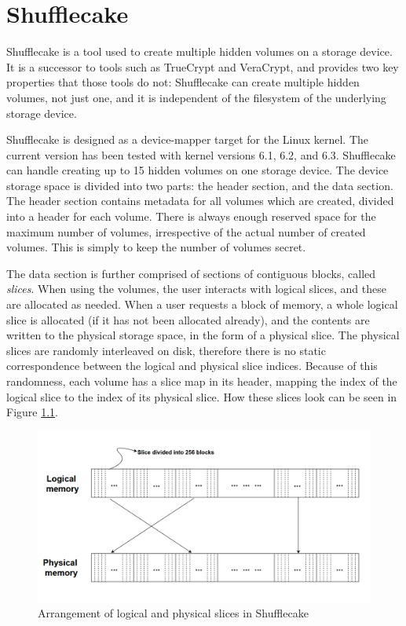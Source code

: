 \documentclass[a4paper,11pt,oneside]{report}
\begin{document}
\chapter{Shufflecake}
Shufflecake is a tool used to create multiple hidden volumes on a storage device. It is a successor to tools such as TrueCrypt and VeraCrypt, and provides two key properties that those tools do not: Shufflecake can create multiple hidden volumes, not just one, and it is independent of the filesystem of the underlying storage device. 

Shufflecake is designed as a device-mapper target for the Linux kernel. The current version has been tested with kernel versions 6.1, 6.2, and 6.3. Shufflecake can handle creating up to 15 hidden volumes on one storage device. The device storage space is divided into two parts: the header section, and the data section. The header section contains metadata for all volumes which are created, divided into a header for each volume. There is always enough reserved space for the maximum number of volumes, irrespective of the actual number of created volumes. This is simply to keep the number of volumes secret. 

The data section is further comprised of sections of contiguous blocks, called \emph{slices}. When using the volumes, the user interacts with logical slices, and these are allocated as needed. When a user requests a block of memory, a whole logical slice is allocated (if it has not been allocated already), and the contents are written to the physical storage space, in the form of a physical slice. The physical slices are randomly interleaved on disk, therefore there is no static correspondence between the logical and physical slice indices. Because of this randomness, each volume has a slice map in its header, mapping the index of the logical slice to the index of its physical slice. How these slices look can be seen in Figure \ref{fig:shufflecake-slices}.

\begin{figure}[!ht]
    \centering
    \includegraphics[scale=0.5]{figures/Shufflecake-slices.PNG}
    \caption{Arrangement of logical and physical slices in Shufflecake}
    \label{fig:shufflecake-slices}
\end{figure}
\end{document}
